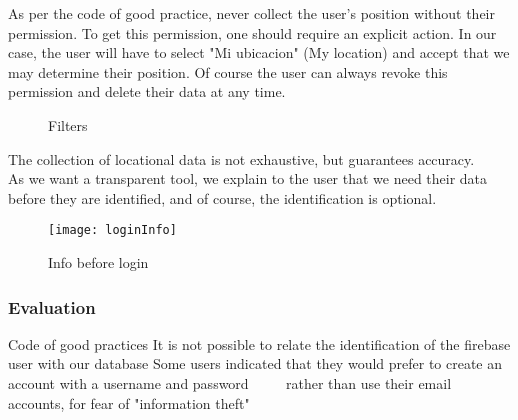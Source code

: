 As per the code of good practice, never collect the user's position without their permission.
To get this permission, one should require an explicit action. In our case, the user will have to select "Mi ubicacion" (My location) and accept 
that we may determine their position. Of course the user can always revoke this permission and
delete their data at any time. \\

\begin{figure}[ht]
    \centering
    \hfill
   
  \caption{Filters}
    \end{figure}

    The collection of locational data is not exhaustive, but guarantees accuracy. \\

    As we want a transparent tool, we explain to the user that we need their data before
    they are identified, and of course, the identification is optional. \\

    \begin{figure}[ht]
        \centering
        \texttt{[image: loginInfo]}
        \caption{Info before login}
    \end{figure}

\subsubsection*{Evaluation}  

\begin{itemize}
    \done Code of good practices
    \done It is not possible to relate the identification of the firebase user with our database
    \crossed Some users indicated that they would prefer to create an account with a username and password
         rather than use their email accounts, for fear of "information theft"
\end{itemize}